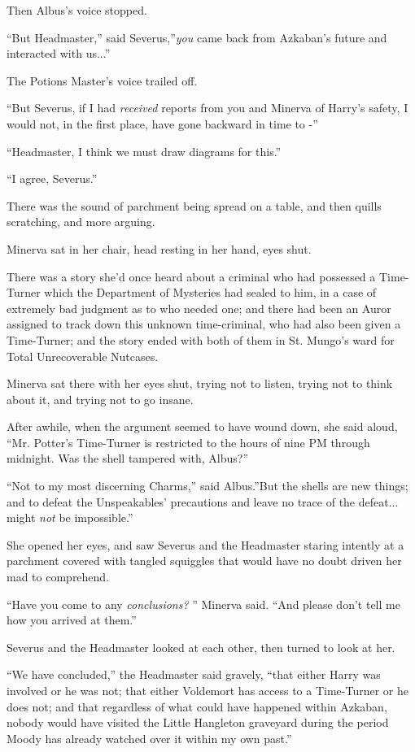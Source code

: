 Then Albus's voice stopped.

``But Headmaster,'' said Severus,''\emph{you} came back from Azkaban's
future and interacted with us...''

The Potions Master's voice trailed off.

``But Severus, if I had \emph{received} reports from you and Minerva of
Harry's safety, I would not, in the first place, have gone backward in
time to -''

``Headmaster, I think we must draw diagrams for this.''

``I agree, Severus.''

There was the sound of parchment being spread on a table, and then
quills scratching, and more arguing.

Minerva sat in her chair, head resting in her hand, eyes shut.

There was a story she'd once heard about a criminal who had possessed a
Time-Turner which the Department of Mysteries had sealed to him, in a
case of extremely bad judgment as to who needed one; and there had been
an Auror assigned to track down this unknown time-criminal, who had also
been given a Time-Turner; and the story ended with both of them in St.
Mungo's ward for Total Unrecoverable Nutcases.

Minerva sat there with her eyes shut, trying not to listen, trying not
to think about it, and trying not to go insane.

After awhile, when the argument seemed to have wound down, she said
aloud, ``Mr. Potter's Time-Turner is restricted to the hours of nine PM
through midnight. Was the shell tampered with, Albus?''

``Not to my most discerning Charms,'' said Albus.''But the shells are
new things; and to defeat the Unspeakables' precautions and leave no
trace of the defeat... might \emph{not} be impossible.''

She opened her eyes, and saw Severus and the Headmaster staring intently
at a parchment covered with tangled squiggles that would have no doubt
driven her mad to comprehend.

``Have you come to any \emph{conclusions?} '' Minerva said. ``And please
don't tell me how you arrived at them.''

Severus and the Headmaster looked at each other, then turned to look at
her.

``We have concluded,'' the Headmaster said gravely, ``that either Harry
was involved or he was not; that either Voldemort has access to a
Time-Turner or he does not; and that regardless of what could have
happened within Azkaban, nobody would have visited the Little Hangleton
graveyard during the period Moody has already watched over it within my
own past.''

